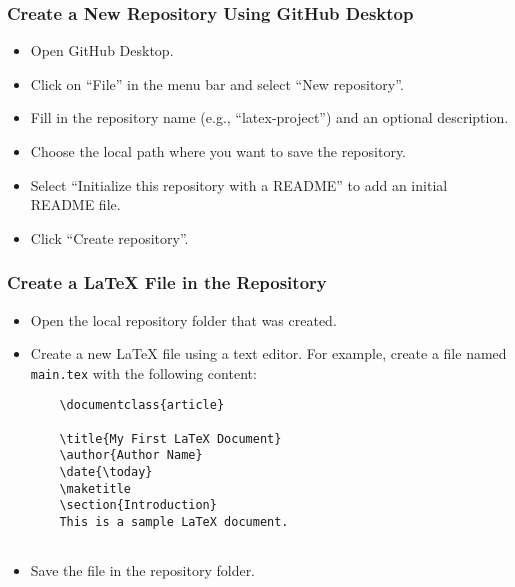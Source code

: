\subsubsection{Create a New Repository Using GitHub Desktop}  %
\begin{itemize}
    \item Open GitHub Desktop.
    \item Click on “File” in the menu bar and select “New repository”.
    \item Fill in the repository name (e.g., “latex-project”) and an optional description.
    \item Choose the local path where you want to save the repository.
    \item Select “Initialize this repository with a README” to add an initial README file.
    \item Click “Create repository”.
    \end{itemize}

\subsubsection{Create a LaTeX File in the Repository}  %
\begin{itemize}
    \item Open the local repository folder that was created.
    \item Create a new LaTeX file using a text editor. For example, create a file named \texttt{main.tex} with the following content:
    \begin{verbatim}
    \documentclass{article}
    
    \title{My First LaTeX Document}
    \author{Author Name}
    \date{\today}
    \maketitle
    \section{Introduction}
    This is a sample LaTeX document.
    
    \end{verbatim}
    \item Save the file in the repository folder.
\end{itemize}

